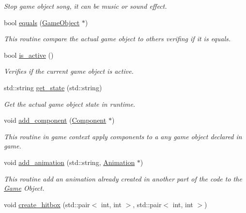 \begin{DoxyCompactItemize}
\begin{DoxyCompactList}\small\item\em Stop game object song, it can be music or sound effect. \end{DoxyCompactList}\item 
bool \hyperlink{classengine_1_1_game_object_a7bceaa3f9faed76a25dc11c9fb3a9b16}{equals} (\hyperlink{classengine_1_1_game_object}{Game\+Object} $\ast$)
\begin{DoxyCompactList}\small\item\em This routine compare the actual game object to others verifing if it is equals. \end{DoxyCompactList}\item 
bool \hyperlink{classengine_1_1_game_object_aac0171415e6af36c39c61288a704c613}{is\+\_\+active} ()
\begin{DoxyCompactList}\small\item\em Verifies if the current game object is active. \end{DoxyCompactList}\item 
std\+::string \hyperlink{classengine_1_1_game_object_acd2c3f8e4ef6a0116108fbb59e9241f1}{get\+\_\+state} (std\+::string)
\begin{DoxyCompactList}\small\item\em Get the actual game object state in runtime. \end{DoxyCompactList}\item 
void \hyperlink{classengine_1_1_game_object_a22d54d2fd7ef478eda303b975c760b0e}{add\+\_\+component} (\hyperlink{classengine_1_1_component}{Component} $\ast$)
\begin{DoxyCompactList}\small\item\em This routine in game context apply components to a any game object declared in game. \end{DoxyCompactList}\item 
void \hyperlink{classengine_1_1_game_object_ab2d993b4a7670e2ed3ffb5d3f681d5ec}{add\+\_\+animation} (std\+::string, \hyperlink{classengine_1_1_animation}{Animation} $\ast$)
\begin{DoxyCompactList}\small\item\em This routine add an animation already created in another part of the code to the \hyperlink{classengine_1_1_game}{Game} Object. \end{DoxyCompactList}\item 
void \hyperlink{classengine_1_1_game_object_a6c1e7f2de3b512452a44fc908dc03f33}{create\+\_\+hitbox} (std\+::pair$<$ int, int $>$, std\+::pair$<$ int, int $>$)

\end{DoxyCompactItemize}

